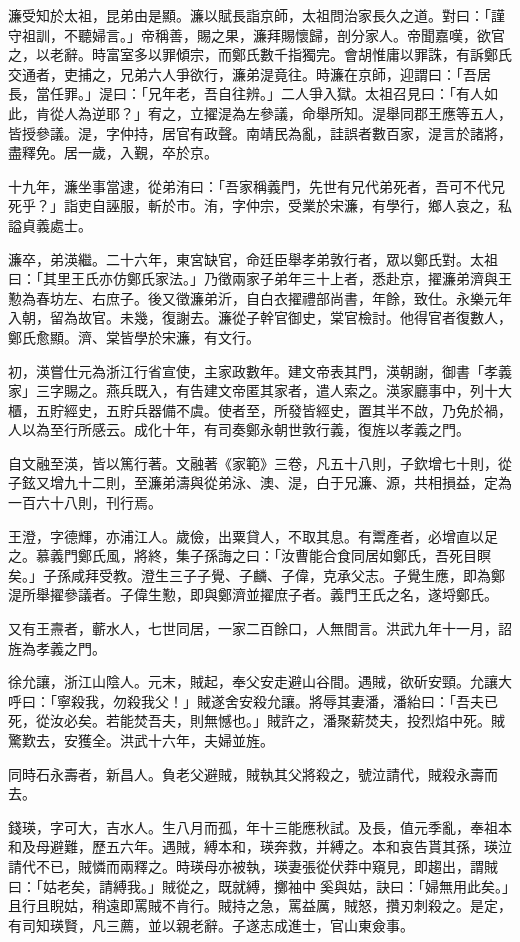 \begin{pinyinscope}
濂受知於太祖，昆弟由是顯。濂以賦長詣京師，太祖問治家長久之道。對曰：「謹守祖訓，不聽婦言。」帝稱善，賜之果，濂拜賜懷歸，剖分家人。帝聞嘉嘆，欲官之，以老辭。時富室多以罪傾宗，而鄭氏數千指獨完。會胡惟庸以罪誅，有訴鄭氏交通者，吏捕之，兄弟六人爭欲行，濂弟湜竟往。時濂在京師，迎謂曰：「吾居長，當任罪。」湜曰：「兄年老，吾自往辨。」二人爭入獄。太祖召見曰：「有人如此，肯從人為逆耶？」宥之，立擢湜為左參議，命舉所知。湜舉同郡王應等五人，皆授參議。湜，字仲持，居官有政聲。南靖民為亂，詿誤者數百家，湜言於諸將，盡釋免。居一歲，入覲，卒於京。

十九年，濂坐事當逮，從弟洧曰：「吾家稱義門，先世有兄代弟死者，吾可不代兄死乎？」詣吏自誣服，斬於市。洧，字仲宗，受業於宋濂，有學行，鄉人哀之，私謚貞義處士。

濂卒，弟渶繼。二十六年，東宮缺官，命廷臣舉孝弟敦行者，眾以鄭氏對。太祖曰：「其里王氏亦仿鄭氏家法。」乃徵兩家子弟年三十上者，悉赴京，擢濂弟濟與王懃為春坊左、右庶子。後又徵濂弟沂，自白衣擢禮部尚書，年餘，致仕。永樂元年入朝，留為故官。未幾，復謝去。濂從子幹官御史，棠官檢討。他得官者復數人，鄭氏愈顯。濟、棠皆學於宋濂，有文行。

初，渶嘗仕元為浙江行省宣使，主家政數年。建文帝表其門，渶朝謝，御書「孝義家」三字賜之。燕兵既入，有告建文帝匿其家者，遣人索之。渶家廳事中，列十大櫃，五貯經史，五貯兵器備不虞。使者至，所發皆經史，置其半不啟，乃免於禍，人以為至行所感云。成化十年，有司奏鄭永朝世敦行義，復旌以孝義之門。

自文融至渶，皆以篤行著。文融著《家範》三卷，凡五十八則，子欽增七十則，從子鉉又增九十二則，至濂弟濤與從弟泳、澳、湜，白于兄濂、源，共相損益，定為一百六十八則，刊行焉。

王澄，字德輝，亦浦江人。歲儉，出粟貸人，不取其息。有鬻產者，必增直以足之。慕義門鄭氏風，將終，集子孫誨之曰：「汝曹能合食同居如鄭氏，吾死目瞑矣。」子孫咸拜受教。澄生三子子覺、子麟、子偉，克承父志。子覺生應，即為鄭湜所舉擢參議者。子偉生懃，即與鄭濟並擢庶子者。義門王氏之名，遂埒鄭氏。

又有王燾者，蘄水人，七世同居，一家二百餘口，人無間言。洪武九年十一月，詔旌為孝義之門。

徐允讓，浙江山陰人。元末，賊起，奉父安走避山谷間。遇賊，欲斫安頸。允讓大呼曰：「寧殺我，勿殺我父！」賊遂舍安殺允讓。將辱其妻潘，潘紿曰：「吾夫已死，從汝必矣。若能焚吾夫，則無憾也。」賊許之，潘聚薪焚夫，投烈焰中死。賊驚歎去，安獲全。洪武十六年，夫婦並旌。

同時石永壽者，新昌人。負老父避賊，賊執其父將殺之，號泣請代，賊殺永壽而去。

錢瑛，字可大，吉水人。生八月而孤，年十三能應秋試。及長，值元季亂，奉祖本和及母避難，歷五六年。遇賊，縛本和，瑛奔救，并縛之。本和哀告貰其孫，瑛泣請代不已，賊憐而兩釋之。時瑛母亦被執，瑛妻張從伏莽中窺見，即趨出，謂賊曰：「姑老矣，請縛我。」賊從之，既就縛，擲袖中奚與姑，訣曰：「婦無用此矣。」且行且睨姑，稍遠即罵賊不肯行。賊持之急，罵益厲，賊怒，攢刃刺殺之。是定，有司知瑛賢，凡三薦，並以親老辭。子遂志成進士，官山東僉事。


\end{pinyinscope}
